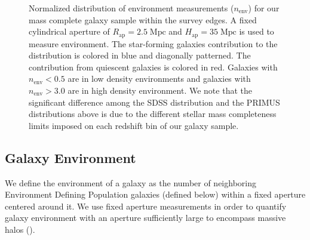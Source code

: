 \documentclass{aastex}
\def \apradius{2.5}
\def \apheight{35}
\begin{document}
\begin{figure}
  \begin{center}
    \leavevmode
    \caption{Normalized distribution of environment measurements ($n_{\mathrm{env}}$) for our mass complete galaxy sample within the survey edges. A fixed cylindrical aperture of $R_{\mathrm{ap}} =\apradius\;\mathrm{Mpc}$ and $H_{\mathrm{ap}} = \apheight\; \mathrm{Mpc}$ is used to measure environment. The star-forming galaxies contribution to the distribution is colored in blue and diagonally patterned. The contribution from quiescent galaxies is colored in red. Galaxies with $n_{\mathrm{env}} < 0.5$ are in low density environments and galaxies with $n_{\mathrm{env}} > 3.0$ are in high density environment. We note that the significant difference among the SDSS distribution and the PRIMUS distributions above is due to the different stellar mass completeness limits imposed on each redshift bin of our galaxy sample.}      \label{fig:envcount}
    \end{center}
\end{figure}

\subsection{Galaxy Environment} \label{sec:environment}
We define the environment of a galaxy as the number of neighboring Environment Defining Population galaxies (defined below) within a fixed aperture centered around it. We use fixed aperture measurements in order to quantify galaxy environment with an aperture sufficiently large to encompass massive halos (\citealt{Muldrew:2012aa, Skibba:2013aa}).
\end{document}
